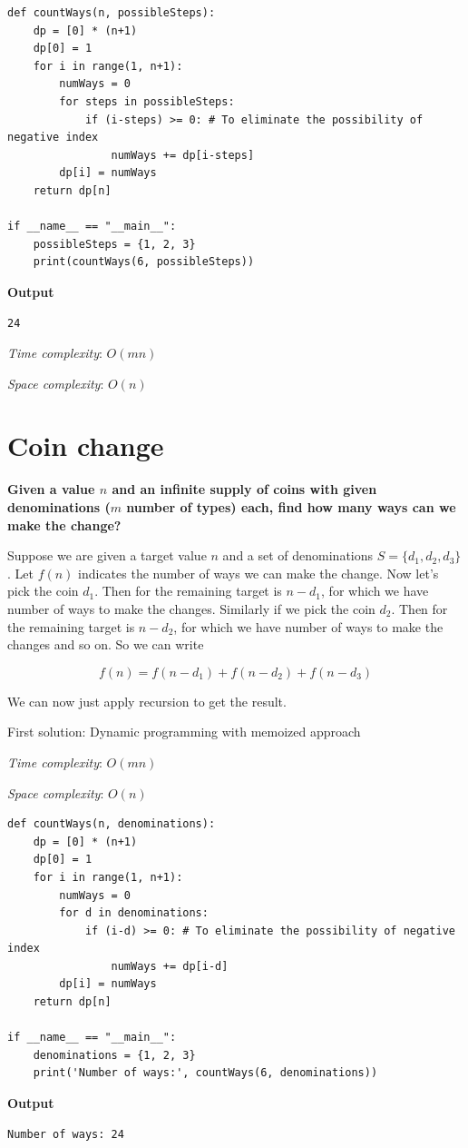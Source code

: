 \documentclass[a4paper,11pt]{book}
\begin{document}
\begin{lstlisting}
def countWays(n, possibleSteps):
    dp = [0] * (n+1)
    dp[0] = 1
    for i in range(1, n+1):
        numWays = 0
        for steps in possibleSteps:
            if (i-steps) >= 0: # To eliminate the possibility of negative index
                numWays += dp[i-steps]
        dp[i] = numWays
    return dp[n]

if __name__ == "__main__":
    possibleSteps = {1, 2, 3}
    print(countWays(6, possibleSteps))
\end{lstlisting}
\textbf{Output}
\begin{lstlisting}
24
\end{lstlisting}

\noindent \textit{Time complexity}: $O(mn)$

\noindent \textit{Space complexity}: $O(n)$

\newpage
\section{Coin change}

\noindent \textbf{Given a value $n$ and an infinite supply of coins with given denominations ($m$ number of types) each, find how many ways can we make the change?}

\vspace{5mm}

\noindent Suppose we are given a target value $n$ and a set of denominations $S = \{d_1, d_2, d_3\}$. Let $f(n)$ indicates the number of ways we can make the change. Now let's pick the coin  $d_1$. Then for the remaining target is $n-d_1$, for which we have number of ways to make the changes. Similarly if we pick the coin  $d_2$. Then for the remaining target is $n-d_2$, for which we have number of ways to make the changes and so on. So we can write

$$f(n) = f(n-d_1) + f(n-d_2) + f(n-d_3)$$

\noindent We can now just apply recursion to get the result.

\noindent First solution: Dynamic programming with memoized approach
\vspace{5mm}

\noindent \textit{Time complexity}: $O(mn)$

\noindent \textit{Space complexity}: $O(n)$

\begin{lstlisting}
def countWays(n, denominations):
    dp = [0] * (n+1)
    dp[0] = 1
    for i in range(1, n+1):
        numWays = 0
        for d in denominations:
            if (i-d) >= 0: # To eliminate the possibility of negative index
                numWays += dp[i-d]
        dp[i] = numWays
    return dp[n]

if __name__ == "__main__":
    denominations = {1, 2, 3}
    print('Number of ways:', countWays(6, denominations))
\end{lstlisting}
\textbf{Output}
\begin{lstlisting}
Number of ways: 24
\end{lstlisting}
\end{document}
